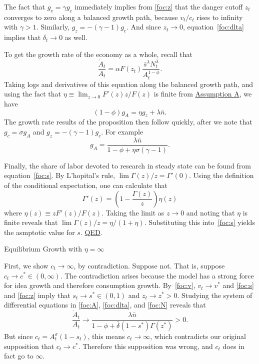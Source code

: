 \documentclass[12pt,twoside]{article}
\newcommand{\growth}[1]{\frac{\dot{#1}_t}{{#1}_t}}
\newcommand{\Proof}[2]{\newline {\hspace{-\parindent} {\color{ChadGreen}\bf Proof of Proposition}~\ref{#1}.}
{\color{ChadBlue} #2} \vspace{.1in}}
\begin{document}
The fact that $g_v=\gamma g_c$ immediately implies from \eqref{foc:z}
that the danger cutoff $z_t$ converges to zero along a balanced growth
path, because $v_t/c_t$ rises to infinity with $\gamma>1$. Similarly,
$g_z=-(\gamma-1)g_c$. And since $z_t \rightarrow 0$,
equation~\eqref{foc:dlta} implies that $\delta_t \rightarrow 0$ as well.

To get the growth rate of the economy as a whole, recall that
\[
\growth{A} = \alpha F(z_t) \frac{\bar{s}^\lambda N_t^{\lambda}}{A_t ^{1-\phi}}.
\]
Taking logs and derivatives of this equation along the balanced growth
path, and using the fact that $\eta \equiv \lim_{z \rightarrow 0} F'(z)
z/F(z)$ is finite from \hyperlink{ASSUME}{Assumption A}, we have
\[
(1-\phi) g_A = \eta g_z +\lambda \bar{n}.
\]
The growth rate results of the proposition then follow quickly, after we
note that $g_c =\sigma g_A$ and $g_z=-(\gamma-1)g_c$.  For example
\[
 g_A = \frac{\lambda \bar{n}}{1-\phi+\eta \sigma (\gamma-1)}.
\]

Finally, the share of labor devoted to research in steady state can be
found from equation~\eqref{foc:s}. By L'hopital's rule, $\lim
\Gamma(z)/z = \Gamma'(0)$. Using the definition of the conditional
expectation, one can calculate that
\[  \Gamma'(z) = \left(1-\frac{\Gamma(z)}{z} \right) \eta(z) \]
where $\eta(z) \equiv zF'(z)/F(z)$. Taking the limit as $ z\rightarrow
0$ and noting that $\eta$ is finite reveals that $\lim
\Gamma(z)/z=\eta/(1+\eta)$.  Substituting this into~\eqref{foc:s} yields
the asmptotic value for $s$. \hyperlink{prop:CE}{QED}.



\hypertarget{proof:eta}{}
\Proof{prop:eta}{Equilibrium Growth with $\eta=\infty$} 

First, we show $c_t \rightarrow \infty$, by contradiction. Suppose not.
That is, suppose $c_t \rightarrow c^* \in (0,\infty)$. The contradiction
arises because the model has a strong force for idea growth and
therefore consumption growth. By~\eqref{foc:v}, $v_t \rightarrow v^*$
and \eqref{foc:s} and \eqref{foc:z} imply that $s_t \rightarrow s^* \in
(0,1)$ and $z_t \rightarrow z^*>0$. Studying the system of differential
equations in \eqref{foc:A}, \eqref{foc:dlta}, and \eqref{foc:N} reveals
that
\[
\growth{A} \rightarrow \frac{\lambda \bar{n}}{1-\phi + \bar{\delta} (1-s^*) \Gamma(z^*)} >0.
\]
But since $c_t=A_t ^\sigma (1-s_t)$, this means $c_t \rightarrow
\infty$, which contradicts our original supposition that $c_t
\rightarrow c^*$. Therefore this supposition was wrong, and $c_t$ does
in fact go to $\infty$.
\end{document}
